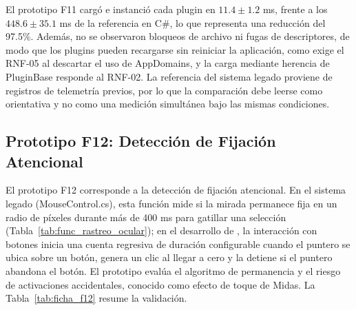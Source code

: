 El prototipo F11 cargó e instanció cada plugin en $11.4 \pm 1.2$ ms, frente a los $448.6 \pm 35.1$ ms de la referencia en C\#, lo que representa una reducción del 97.5\%. Además, no se observaron bloqueos de archivo ni fugas de descriptores, de modo que los plugins pueden recargarse sin reiniciar la aplicación, como exige el RNF-05 al descartar el uso de AppDomains, y la carga mediante herencia de PluginBase responde al RNF-02. La referencia del sistema legado proviene de registros de telemetría previos, por lo que la comparación debe leerse como orientativa y no como una medición simultánea bajo las mismas condiciones.
 
\subsection{Prototipo F12: Detección de Fijación Atencional}
 
El prototipo F12 corresponde a la detección de fijación atencional. En el sistema legado (MouseControl.cs), esta función mide si la mirada permanece fija en un radio de píxeles durante más de 400 ms para gatillar una selección (Tabla~\ref{tab:func_rastreo_ocular}); en el desarrollo de \cite{estay2020modulo}, la interacción con botones inicia una cuenta regresiva de duración configurable cuando el puntero se ubica sobre un botón, genera un clic al llegar a cero y la detiene si el puntero abandona el botón. El prototipo evalúa el algoritmo de permanencia y el riesgo de activaciones accidentales, conocido como efecto de toque de Midas. La Tabla~\ref{tab:ficha_f12} resume la validación.
 
